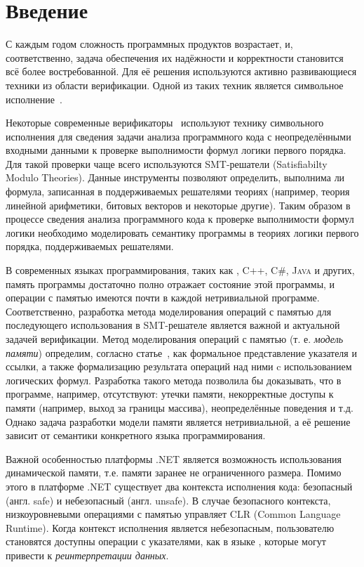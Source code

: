 \section{Введение}
С каждым годом сложность программных продуктов возрастает, и, соответственно, задача обеспечения их надёжности и корректности становится всё более востребованной. Для её решения используются активно развивающиеся техники из области верификации. Одной из таких техник является символьное исполнение~\cite{wenenhancing, li2014symbolic}.

Некоторые современные верификаторы~\cite{sethu2018systems, wang2017dependence, sharma2018veritesting} используют технику символьного исполнения для сведения задачи анализа программного кода с неопределёнными входными данными к проверке выполнимости формул логики первого порядка. Для такой проверки чаще всего используются SMT-решатели (Satisfiabilty Modulo Theories). Данные инструменты позволяют определить, выполнима ли формула, записанная в поддерживаемых
решателями теориях (например, теория линейной арифметики, битовых векторов и некоторые другие). Таким образом в процессе сведения анализа программного кода к проверке выполнимости формул логики необходимо моделировать семантику программы в теориях логики первого порядка, поддерживаемых решателями.

В современных языках программирования, таких как \clang{}, \textsc{C++}, \textsc{C\#}, \textsc{Java} и других, память программы достаточно полно отражает состояние этой программы, и операции с памятью имеются почти в каждой нетривиальной программе. Соответственно, разработка метода моделирования операций с памятью для последующего использования в \foreignlanguage{english}{SMT}-решателе является важной и актуальной задачей верификации. Метод моделирования операций с памятью (т. е. \emph{модель памяти}) определим, согласно статье~\cite{mandrik}, как формальное представление указателя и ссылки, а также формализацию результата операций над ними c использованием логических формул. Разработка такого метода позволила бы доказывать, что в программе, например, отсутствуют: утечки памяти, некорректные доступы к памяти (например, выход за границы массива), неопределённые поведения и т.д. Однако задача разработки модели памяти является нетривиальной, а её решение зависит от семантики конкретного языка программирования.

Важной особенностью платформы .NET является возможность использования динамической памяти, т.е. памяти заранее не ограниченного размера. Помимо этого в платформе .NET существует два контекста исполнения кода: безопасный (англ. \foreignlanguage{english}{safe}) и небезопасный (англ. \foreignlanguage{english}{unsafe}). В случае безопасного контекста, низкоуровневыми операциями с памятью управляет \textsc{CLR} (\foreignlanguage{english}{Common Language Runtime}). Когда контекст исполнения является небезопасным, пользователю становятся доступны операции с указателями, как в языке \clang{}, которые могут привести к \emph{реинтерпретации данных}.

